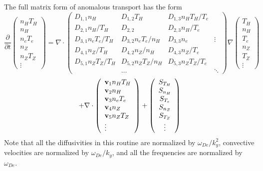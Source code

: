 The full matrix form of anomalous transport has the form
$$ \frac{\partial}{\partial t}
 \left( \begin{array}{c} n_H T_H  \\ n_H \\ n_e T_e \\ 
    n_Z \\ n_Z T_Z \\ \vdots
    \end{array} \right)
 = \nabla \cdot
\left( \begin{array}{llll} 
D_{1,1} n_H & D_{1,2} T_H & D_{1,3} n_H T_H / T_e \\
D_{2,1} n_H / T_H & D_{2,2} & D_{2,3} n_H / T_e \\
D_{3,1} n_e T_e / T_H & D_{3,2} n_e T_e / n_H & D_{3,3} n_e & \vdots \\
D_{4,1} n_Z / T_H & D_{4,2} n_Z / n_H & D_{4,3} n_Z / T_e \\
D_{5,1} n_Z T_Z / T_H & D_{5,2} n_Z T_Z / n_H & 
        D_{5,3} n_Z T_Z / T_e \\
 & \ldots & & \ddots
\end{array} \right)
 \nabla
 \left( \begin{array}{c}  T_H \\ n_H \\  T_e \\ 
   n_Z \\  T_Z \\ \vdots
    \end{array} \right)
$$
$$
 + \nabla \cdot
\left( \begin{array}{l} {\bf v}_1 n_H T_H \\ {\bf v}_2 n_H \\
   {\bf v}_3 n_e T_e \\
   {\bf v}_4 n_Z \\ {\bf v}_5 n_Z T_Z \\ \vdots \end{array} \right) +
 \left( \begin{array}{c} S_{T_H} \\ S_{n_H} \\ S_{T_e} \\
    S_{n_Z} \\ S_{T_Z} \\ \vdots
    \end{array} \right) $$
Note that all the diffusivities in this routine are normalized by
$ \omega_{De} / k_y^2 $, 
convective velocities are normalized by $ \omega_{De} / k_y $, 
and all the frequencies are normalized by $ \omega_{De} $.

